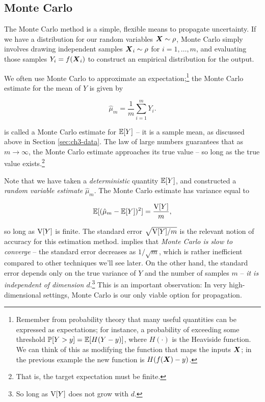 \documentclass[../primer.tex]{subfiles}
\begin{document}
\subsection{Monte Carlo}
The Monte Carlo method is a simple, flexible means to propagate uncertainty. If
we have a distribution for our random variables $\boldsymbol{X}\sim\rho$, Monte Carlo
simply involves drawing independent samples $\boldsymbol{X}_i\sim\rho$ for $i=1,\dots,m$,
and evaluating those samples $Y_i = f(\boldsymbol{X}_i)$ to construct an empirical
distribution for the output.

We often use Monte Carlo to approximate an expectation;\footnote{Remember from
  probability theory that many useful quantities can be expressed as
  expectations; for instance, a probability of exceeding some threshold $\mathbb{P}[Y>y]
  = \mathbb{E}[H(Y-y)]$, where $H(\cdot)$ is the Heaviside function. We can think of
  this as modifying the function that maps the inputs $\boldsymbol{X}$; in the previous
  example the new function is $H(f(\boldsymbol{X})-y)$.} the Monte Carlo estimate for the
mean of $Y$ is given by

\begin{equation} \label{eq:ch4-mc-mean}
  \hat{\mu}_m = \frac{1}{m}\sum_{i=1}^m Y_i.
\end{equation}

\noindent {} is called a Monte Carlo estimate for $\mathbb{E}[Y]$ --
it is a sample mean, as discussed above in Section \ref{sec:ch3-data}. The law
of large numbers guarantees that as $m\to\infty$, the Monte Carlo estimate
approaches its true value -- so long as the true value
exists.\cite{owen2013montecarlo}\footnote{That is, the target expectation must
  be finite.}

Note that we have taken a \emph{deterministic} quantity $\mathbb{E}[Y]$, and constructed
a \emph{random variable estimate} $\hat{\mu}_m$. The Monte Carlo estimate has
variance equal to

\begin{equation} \label{eq:ch4-mc-var}
  \mathbb{E}[(\hat{\mu}_m - \mathbb{E}[Y])^2] = \frac{\mathrm{V}[Y]}{m},
\end{equation}

\noindent so long as $\mathrm{V}[Y]$ is finite. The standard error $\sqrt{\mathrm{V}[Y]/m}$ is
the relevant notion of accuracy for this estimation method. 
implies that \emph{Monte Carlo is slow to converge} -- the standard error
decreases as $1/\sqrt{m}$, which is rather inefficient compared to other
techniques we'll see later. On the other hand, the standard error depends only
on the true variance of $Y$ and the number of samples $m$ -- \emph{it is
  independent of dimension $d$}.\footnote{So long as $\mathrm{V}[Y]$ does not grow with
  $d$.} This is an important observation: In very high-dimensional settings,
Monte Carlo is our only viable option for propagation.
\end{document}
